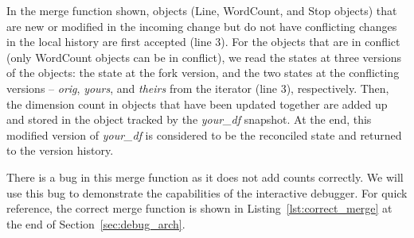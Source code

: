In the merge function shown, objects (Line, WordCount, and Stop objects) that are new or modified in the incoming change but do not have conflicting changes in the local history are first accepted (line 3). For the objects that are in conflict (only WordCount objects can be in conflict), we read the states at three versions of the objects: the state at the fork version, and the two states at the conflicting versions -- {\em orig}, {\em yours}, and {\em theirs} from the iterator (line 3), respectively. Then, the dimension count in objects that have been updated together are added up and stored in the object tracked by the {\em your\_df} snapshot. At the end, this modified version of {\em your\_df} is considered to be the reconciled state and returned to the version history. 

There is a bug in this merge function as it does not add counts correctly. We will use this bug to demonstrate the capabilities of the interactive debugger. For quick reference, the correct merge function is shown in Listing~\ref{lst:correct_merge} at the end of Section~\ref{sec:debug_arch}.
